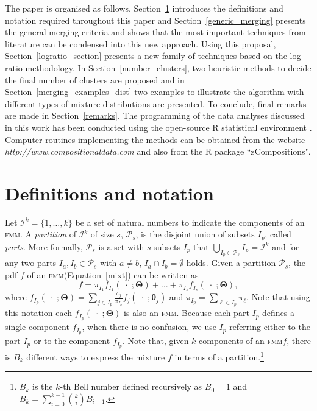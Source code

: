 \documentclass[submit]{smj}
\theoremstyle{definition}
\newcommand{\m}[1]{\boldsymbol{#1}}
\newcommand{\fmm}{\textsc{fmm}\xspace}
\begin{document}
The paper is organised as follows. Section~\ref{definitions} introduces the definitions and notation required throughout this paper and Section~\ref{generic_merging} presents the general merging criteria and shows that the most important techniques from literature can be condensed into this new approach. Using this proposal, Section~\ref{logratio_section} presents a new family of techniques based on the log-ratio methodology. In Section~\ref{number_clusters}, two heuristic methods to decide the final number of clusters are proposed and in Section~\ref{merging_examples_dist} two examples to illustrate the algorithm with different types of mixture distributions are presented. To conclude, final remarks are made in Section~\ref{remarks}. The programming of the data analyses discussed in this work has been conducted using the open-source R statistical environment \citep{R}. Computer routines implementing the methods can be obtained from the website {\em http://www.compositionaldata.com} and also from the R package ``zCompositions".

\section{Definitions and notation}\label{definitions}

%
Let $\mathcal{I}^k = \{1, \dots, k\}$ be a set of natural numbers to indicate the components of an \fmm. A \emph{partition} of $\mathcal{I}^k$ of size $s$, $\mathcal{P}_s$, is the disjoint union of subsets $I_p$, called \emph{parts}. More formally, $\mathcal{P}_s$ is a set with $s$ subsets $I_p$  that $\bigcup_{I_p \in \mathcal{P}_s} I_p = \mathcal{I}^k$ and for any two parts $I_a, I_b \in \mathcal{P}_s$ with $a \neq b$, $I_a \cap I_b = \emptyset$ holds. Given a partition  $\mathcal{P}_s$, the pdf $f$ of an \fmm (Equation~\ref{mixt}) can be written as
\begin{equation}
f = \pi_{I_1} f_{I_1}(\;\cdot\;; \m\Theta) + \dots + \pi_{I_s} f_{I_s}(\;\cdot\;; \m\Theta),
\label{mixt_part}
\end{equation}
where $f_{I_p}(\;\cdot\;;  \m\Theta) = \sum_{j \in I_p} \frac{\pi_j}{\pi_{I_p}} f_j(\;\cdot\; ; \m\theta_j)$ and $\pi_{I_p} = \sum_{\ell \in I_p} \pi_\ell$. Note that using this notation each $f_{I_p}(\;\cdot\;;  \m\Theta)$ is also an \fmm. Because each part $I_p$ defines a single component $f_{I_p}$, when there is no confusion, we use $I_p$ referring either to the part $I_p$ or to the component $f_{I_p}$. Note that, given $k$ components of an \fmm $f$, there is $B_k$ different ways to express the mixture  $f$ in terms of a partition.\footnote{$B_k$ is the $k$-th Bell number defined recursively as $B_0 = 1$ and $B_k = \sum_{i=0}^{k-1} \binom ki B_{i-1}$.}
\end{document}

